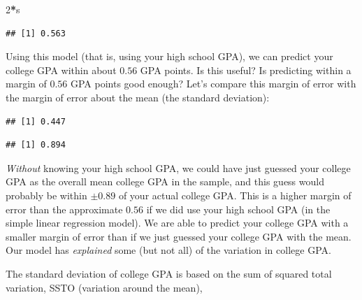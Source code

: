 \documentclass[]{book}
\newenvironment{Shaded}{\begin{snugshade}}{\end{snugshade}}
\newcommand{\DecValTok}[1]{\textcolor[rgb]{0.00,0.00,0.81}{#1}}
\newcommand{\KeywordTok}[1]{\textcolor[rgb]{0.13,0.29,0.53}{\textbf{#1}}}
\newcommand{\NormalTok}[1]{#1}
\newcommand{\OperatorTok}[1]{\textcolor[rgb]{0.81,0.36,0.00}{\textbf{#1}}}
\begin{document}
\begin{Shaded}
\begin{Highlighting}[]
\DecValTok{2}\OperatorTok{*}\NormalTok{s}
\end{Highlighting}
\end{Shaded}

\begin{verbatim}
## [1] 0.563
\end{verbatim}

Using this model (that is, using your high school GPA), we can predict your college GPA within about \(0.56\) GPA points. Is this useful? Is predicting within a margin of \(0.56\) GPA points good enough? Let's compare this margin of error with the margin of error about the mean (the standard deviation):

\begin{Shaded}
\end{Shaded}

\begin{verbatim}
## [1] 0.447
\end{verbatim}

\begin{Shaded}
\end{Shaded}

\begin{verbatim}
## [1] 0.894
\end{verbatim}

\emph{Without} knowing your high school GPA, we could have just guessed your college GPA as the overall mean college GPA in the sample, and this guess would probably be within \(\pm 0.89\) of your actual college GPA. This is a higher margin of error than the approximate \(0.56\) if we did use your high school GPA (in the simple linear regression model). We are able to predict your college GPA with a smaller margin of error than if we just guessed your college GPA with the mean. Our model has \emph{explained} some (but not all) of the variation in college GPA.

The standard deviation of college GPA is based on the sum of squared total variation, SSTO (variation around the mean),
\end{document}
